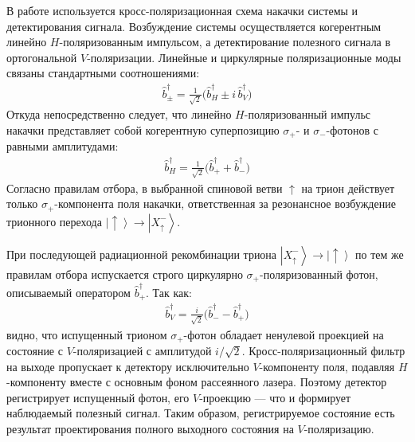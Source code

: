 \documentclass[11pt]{article}    %
\numberwithin{equation}{section}
\begin{document}
В работе \cite{krainov2025} используется кросс-поляризационная схема
накачки системы и детектирования сигнала.
Возбуждение системы осуществляется когерентным линейно $H$-поляризованным
импульсом, а детектирование полезного сигнала в ортогональной
$V$-поляризации.
Линейные и циркулярные поляризационные моды связаны
стандартными соотношениями:
\begin{gather}
    \hat{b}^{\dag}_{\pm} = \tfrac{1}{\sqrt{2}}
    \bigl( \hat{b}^{\dag}_{H} \pm i\, \hat{b}^{\dag}_{V} \bigr)
\end{gather}
Откуда непосредственно следует, что линейно $H$-поляризованный импульс
накачки представляет собой когерентную суперпозицию $\sigma_+$- и
$\sigma_-$-фотонов с равными амплитудами:
\begin{gather}
    \hat{b}^{\dag}_{H} = \tfrac{1}{\sqrt{2}}
    \bigl( \hat{b}^{\dag}_{+} + \hat{b}^{\dag}_{-} \bigr)
\end{gather}
Согласно правилам отбора, в выбранной спиновой ветви $\uparrow$ на трион
действует только $\sigma_+$-компонента поля накачки, ответственная
за резонансное возбуждение трионного перехода
$\left|\uparrow\right\rangle \to \left|X^-_{\uparrow}\right\rangle$.

При последующей радиационной рекомбинации триона
$\left|X^-_{\uparrow}\right\rangle \to \left|\uparrow\right\rangle$
по тем же правилам отбора испускается строго циркулярно
$\sigma_+$-поляризованный фотон, описываемый оператором
$\hat{b}^{\dag}_{+}$.
Так как:
\begin{gather}
    \hat{b}^{\dag}_{V} = \frac{i}{\sqrt{2}}
    \bigl( \hat{b}^{\dag}_{-} - \hat{b}^{\dag}_{+} \bigr)
\end{gather}
видно, что испущенный трионом $\sigma_+$-фотон обладает
ненулевой проекцией на состояние с $V$-поляризацией
с амплитудой $i/\sqrt{2}$.
Кросс-поляризационный фильтр на выходе пропускает к детектору
исключительно $V$-компоненту поля, подавляя $H$-компоненту вместе с
основным фоном рассеянного лазера. Поэтому детектор регистрирует
испущенный фотон, его $V$-проекцию --- что и
формирует наблюдаемый полезный сигнал.
Таким образом, регистрируемое состояние есть результат
проектирования полного выходного состояния на $V$-поляризацию.
\end{document}
